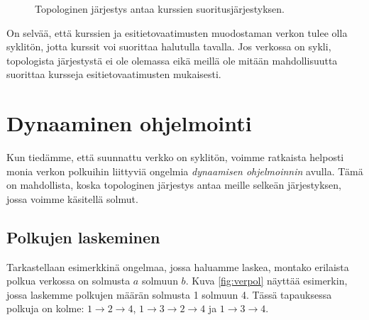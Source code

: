 \begin{figure}
\center
\begin{center}
\end{center}
\caption{Topologinen järjestys antaa kurssien suoritusjärjestyksen.}
\label{fig:kurjar}
\end{figure}

On selvää, että kurssien ja esitietovaatimusten muodostaman
verkon tulee olla syklitön, jotta kurssit voi suorittaa halutulla tavalla.
Jos verkossa on sykli, topologista järjestystä ei ole olemassa
eikä meillä ole mitään mahdollisuutta suorittaa kursseja
esitietovaatimusten mukaisesti.

\section{Dynaaminen ohjelmointi}

Kun tiedämme, että suunnattu verkko on syklitön,
voimme ratkaista helposti monia verkon polkuihin
liittyviä ongelmia \emph{dynaamisen ohjelmoinnin} avulla.
Tämä on mahdollista, koska topologinen järjestys antaa
meille selkeän järjestyksen, jossa voimme käsitellä solmut.

\subsection{Polkujen laskeminen}

Tarkastellaan esimerkkinä ongelmaa, jossa haluamme
laskea, montako erilaista polkua verkossa on
solmusta $a$ solmuun $b$.
Kuva \ref{fig:verpol} näyttää esimerkin,
jossa laskemme polkujen määrän solmusta 1
solmuun 4.
Tässä tapauksessa polkuja on kolme:
$1 \rightarrow 2 \rightarrow 4$,
$1 \rightarrow 3 \rightarrow 2 \rightarrow 4$ ja
$1 \rightarrow 3 \rightarrow 4$.

